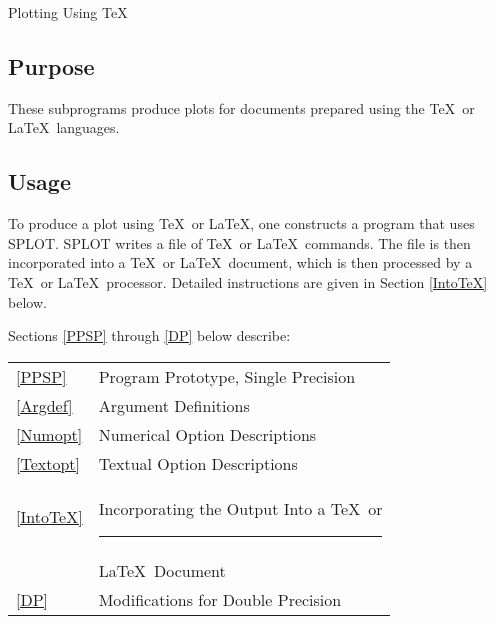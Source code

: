 \documentclass[twoside]{MATH77}
\begin{document}
 Plotting Using \TeX


\subsection{Purpose}

These subprograms produce plots for documents prepared using the \TeX\ or
\LaTeX\ languages.

\subsection{Usage}

To produce a plot using \TeX\ or \LaTeX, one constructs a program that uses
SPLOT.  SPLOT writes a file of \TeX\ or \LaTeX\ commands.  The file is
then incorporated into a \TeX\ or \LaTeX\ document, which is then processed
by a \TeX\ or \LaTeX\ processor.  Detailed instructions are given in
Section \ref{IntoTeX} below.

Sections \ref{PPSP} through \ref{DP} below describe:\\
\begin{tabular*}{3.20in}{@{}l@{~~~}l}
\quad \ref{PPSP}    & Program Prototype, Single Precision\dotfill \pageref{PPSP}\\
\quad \ref{Argdef}  & Argument Definitions\dotfill \pageref{Argdef}\\
\quad \ref{Numopt}  & Numerical Option Descriptions\dotfill \pageref{Numopt}\\
\quad \ref{Textopt} & Textual Option Descriptions\dotfill \pageref{Textopt}\\
\quad \ref{IntoTeX} & Incorporating the Output Into a \TeX\ or\rule{0.50in}{0pt}\\
 & \LaTeX\ Document\dotfill
 \pageref{IntoTeX}\\
\quad \ref{DP}      & Modifications for Double Precision\dotfill \pageref{DP}\\
\end{tabular*}
\end{document}
